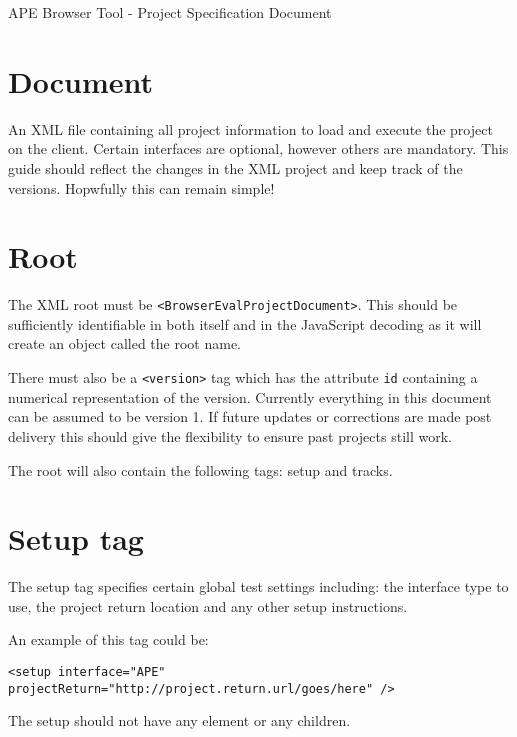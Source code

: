 \documentclass{article}
\begin{document}
\large APE Browser Tool - Project Specification Document

\section{Document}

An XML file containing all project information to load and execute the project on the client. Certain interfaces are optional, however others are mandatory. This guide should reflect the changes in the XML project and keep track of the versions. Hopwfully this can remain simple!

\section{Root}

The XML root must be \texttt{<BrowserEvalProjectDocument>}. This should be sufficiently identifiable in both itself and in the JavaScript decoding as it will create an object called the root name.

There must also be a \texttt{<version>} tag which has the attribute \texttt{id} containing a numerical representation of the version. Currently everything in this document can be assumed to be version 1. If future updates or corrections are made post delivery this should give the flexibility to ensure past projects still work.

The root will also contain the following tags: setup and tracks.

\section{Setup tag}

The setup tag specifies certain global test settings including: the interface type to use, the project return location and any other setup instructions.

An example of this tag could be:

\texttt{<setup interface="APE" projectReturn="http://project.return.url/goes/here" />}

The setup should not have any element or any children.
\end{document}
